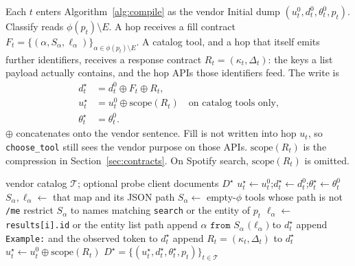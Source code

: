 \documentclass[11pt,a4paper]{article}
\begin{document}
Each $t$ enters Algorithm~\ref{alg:compile} as the vendor Initial dump $(u_t^0,d_t^0,\theta_t^0,p_t)$. Classify reads $\phi(p_t)\setminus E$. A hop receives a fill contract $F_t=\{(\alpha,S_\alpha,\ell_\alpha)\}_{\alpha\in\phi(p_t)\setminus E}$. A catalog tool, and a hop that itself emits further identifiers, receives a response contract $R_t=(\kappa_t,\Delta_t)$: the keys a list payload actually contains, and the hop APIs those identifiers feed. The write is
\begin{align}
d_t^\star &= d_t^0 \oplus F_t \oplus R_t, \label{eq:guideline}\\
u_t^\star &= u_t^0 \oplus \mathrm{scope}(R_t) \quad\text{on catalog tools only,} \label{eq:purpose}\\
\theta_t^\star &= \theta_t^0. \label{eq:schema}
\end{align}
$\oplus$ concatenates onto the vendor sentence. Fill is not written into hop $u_t$, so \texttt{choose\_tool} still sees the vendor purpose on those APIs. $\mathrm{scope}(R_t)$ is the compression in Section~\ref{sec:contracts}. On Spotify search, $\mathrm{scope}(R_t)$ is omitted.

\begin{algorithm}[H]
\caption{Compile fill and response contracts from a vendor catalog.}
\label{alg:compile}
\begin{algorithmic}[1]
\Require vendor catalog $\mathcal{T}$; optional probe client
\Ensure documents $D^\star$
  \State $u_t^\star \gets u_t^0$;\quad $d_t^\star \gets d_t^0$;\quad $\theta_t^\star \gets \theta_t^0$
        \State $S_\alpha,\ell_\alpha \gets$ that map and its JSON path
      \Else
        \State $S_\alpha \gets$ empty-$\phi$ tools whose path is not \texttt{/me}
        \State restrict $S_\alpha$ to names matching \texttt{search} or the entity of $p_t$
        \State $\ell_\alpha \gets$ \texttt{results[i].id} or the entity list path
      \EndIf
    \EndFor
    \State append $\texttt{$\alpha$ from $S_\alpha$ ($\ell_\alpha$)}$ to $d_t^\star$
      \State append \texttt{Example:} and the observed token to $d_t^\star$
    \EndIf
  \EndIf
    \State append $R_t=(\kappa_t,\Delta_t)$ to $d_t^\star$
      \State $u_t^\star \gets u_t^0 \oplus \mathrm{scope}(R_t)$
    \EndIf
  \EndIf
\EndFor
\State \Return $D^\star=\{(u_t^\star,d_t^\star,\theta_t^\star,p_t)\}_{t\in\mathcal{T}}$
\end{algorithmic}
\end{algorithm}
\end{document}
